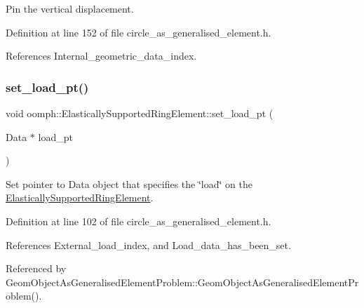 Pin the vertical displacement. 



Definition at line 152 of file circle\+\_\+as\+\_\+generalised\+\_\+element.\+h.



References Internal\+\_\+geometric\+\_\+data\+\_\+index.

\mbox{\label{classoomph_1_1ElasticallySupportedRingElement_ac1c967080f2a4e6143bcffdcdbc1d735}} 
\subsubsection{\texorpdfstring{set\+\_\+load\+\_\+pt()}{set\_load\_pt()}}
{\footnotesize\ttfamily void oomph\+::\+Elastically\+Supported\+Ring\+Element\+::set\+\_\+load\+\_\+pt (\begin{DoxyParamCaption}\item[{Data $\ast$}]{load\+\_\+pt }\end{DoxyParamCaption})\hspace{0.3cm}{\ttfamily [inline]}}



Set pointer to Data object that specifies the \char`\"{}load\char`\"{} on the \hyperlink{classoomph_1_1ElasticallySupportedRingElement}{Elastically\+Supported\+Ring\+Element}. 



Definition at line 102 of file circle\+\_\+as\+\_\+generalised\+\_\+element.\+h.



References External\+\_\+load\+\_\+index, and Load\+\_\+data\+\_\+has\+\_\+been\+\_\+set.



Referenced by Geom\+Object\+As\+Generalised\+Element\+Problem\+::\+Geom\+Object\+As\+Generalised\+Element\+Problem().

\mbox{\label{classoomph_1_1ElasticallySupportedRingElement_ad70712dca329430d09d1a905c1362478}} 
